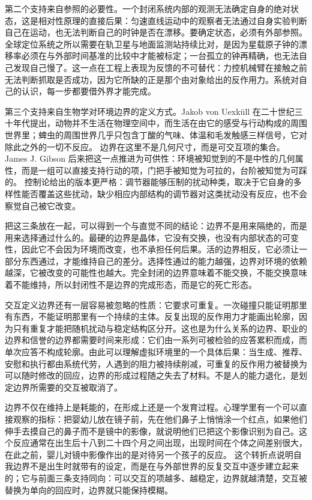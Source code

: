 
第二个支持来自参照的必要性。一个封闭系统内部的观测无法确定自身的绝对状态，这是相对性原理的直接后果：匀速直线运动中的观察者无法通过自身实验判断自己在运动，也无法判断自己的时钟是否在漂移。要确定状态，必须有外部参照。全球定位系统之所以需要在轨卫星与地面监测站持续比对，是因为星载原子钟的漂移率必须在与外部时间基准的比较中才能被标定；一台孤立的钟再精确，也无法自己发现自己慢了。这一点在工程上表现为反馈的不可替代：力控机械臂在接触之前无法判断抓取是否成功，因为它所缺的正是那个由对象给出的反作用力。系统对自己的认识，每一步都要借外界才能完成。

第三个支持来自生物学对环境边界的定义方式。Jakob von Uexk{\"u}ll 在二十世纪三十年代提出，动物并不生活在物理空间中，而生活在由它的感受与行动构成的周围世界里；蜱虫的周围世界几乎只包含丁酸的气味、体温和毛发触感三样信号，它对除此之外的一切不反应。\cite{uexkull1934streifzuge} 边界在这里不是几何尺寸，而是可交互项的集合。James J. Gibson 后来把这一点推进为可供性：环境被知觉到的不是中性的几何属性，而是一组可以直接支持行动的项，门把手被知觉为可拉的，台阶被知觉为可踩的。\cite{gibson1979} 控制论给出的版本更严格：调节器能够压制的扰动种类，取决于它自身的多样性能否覆盖这些扰动，缺少相应内部结构的调节器对这类扰动没有反应，也不会察觉自己被它改变。\cite{ashby1956cybernetics}


把这三条放在一起，可以得到一个与直觉不同的结论：边界不是用来隔绝的，而是用来选择通过什么的。最硬的边界是晶体，它没有交换，也没有内部状态的可变性，因此它不会因为环境而改变，也不承担任何后果。活的边界相反，它必须让一部分东西通过，才能维持自己的差分。选择性通过的能力越强，边界对环境的依赖越深，它被改变的可能性也越大。完全封闭的边界意味着不能交换，不能交换意味着不能维持，所以封闭性不是边界的完成形态，而是它的死亡形态。

交互定义边界还有一层容易被忽略的性质：它要求可重复。一次碰撞只能证明那里有东西，不能证明那里有一个持续的主体。反复出现的反作用力才能画出轮廓，因为只有重复才能把随机扰动与稳定结构区分开。这也是为什么关系的边界、职业的边界和信誉的边界都需要时间来形成：它们由一系列可被检验的应答累积而成，而单次应答不构成轮廓。由此可以理解虚拟环境里的一个具体后果：当生成、推荐、安慰和执行都由系统代劳，人遇到的阻力被持续削减，可重复的反作用力被替换为可以随时修改的回应，边界的形成过程随之失去了材料。不是人的能力退化，是划定边界所需要的交互被取消了。


边界不仅在维持上是耗能的，在形成上还是一个发育过程。心理学里有一个可以直接观察的指标：把婴幼儿放在镜子前，先在他们鼻子上悄悄涂一个红点，如果他们伸手去摸自己的鼻子而不是镜中的影像，就说明他们已把这个影像识别为自己。这个反应通常在出生后十八到二十四个月之间出现，出现时间在个体之间差别很大，在此之前，婴儿对镜中影像作出的是对待另一个孩子的反应。\cite{amsterdam1972mirror} 这个转折点说明自我边界不是出生时就带有的设定，而是在与外部世界的反复交互中逐步建立起来的；它与前面三条支持同向：可以交互的项越多、越稳定，边界就越清楚，交互被替换为单向的回应时，边界就只能保持模糊。

